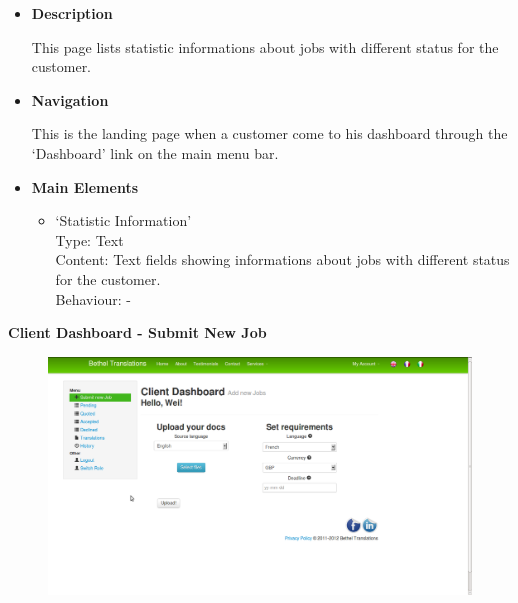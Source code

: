 \documentclass{l3proj}
\begin{document}
\begin{itemize}
\item \textbf{Description}

This page lists statistic informations about jobs with different status for the customer.\\

\item \textbf{Navigation}

This is the landing page when a customer come to his dashboard through the `Dashboard' link on the main menu bar.

\item \textbf{Main Elements}
\begin{itemize}

\item `Statistic Information'\\
Type: Text\\
Content: Text fields showing informations about jobs with different status for the customer.\\
Behaviour: - \\

\end{itemize}
\end{itemize}

\textbf{Client Dashboard - Submit New Job}
\begin{figure}[H]
\centering
\includegraphics[width=0.8\linewidth]{images/clientDashNewJob}
\vspace{-30pt}
\end{figure}
\end{document}
